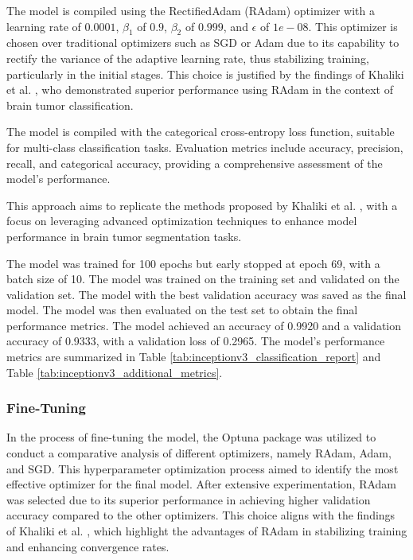 The model is compiled using the RectifiedAdam (RAdam) optimizer \cite{liu_variance_2019} with a learning rate of $0.0001$, $\beta_1$ of $0.9$, $\beta_2$ of $0.999$, and $\epsilon$ of $1e-08$. This optimizer is chosen over traditional optimizers such as SGD or Adam due to its capability to rectify the variance of the adaptive learning rate, thus stabilizing training, particularly in the initial stages. This choice is justified by the findings of Khaliki et al. \cite{khaliki_brain_2024}, who demonstrated superior performance using RAdam in the context of brain tumor classification.

The model is compiled with the categorical cross-entropy loss function, suitable for multi-class classification tasks. Evaluation metrics include accuracy, precision, recall, and categorical accuracy, providing a comprehensive assessment of the model's performance.

This approach aims to replicate the methods proposed by Khaliki et al. \cite{khaliki_brain_2024}, with a focus on leveraging advanced optimization techniques to enhance model performance in brain tumor segmentation tasks.

%
The model was trained for 100 epochs but early stopped at epoch 69, with a batch size of 10. The model was trained on the training set and validated on the validation set. The model with the best validation accuracy was saved as the final model. The model was then evaluated on the test set to obtain the final performance metrics. The model achieved an accuracy of 0.9920 and a validation accuracy of 0.9333, with a validation loss of 0.2965. The model's performance metrics are summarized in Table \ref{tab:inceptionv3_classification_report} and Table \ref{tab:inceptionv3_additional_metrics}.

\subsubsection{Fine-Tuning}

In the process of fine-tuning the model, the Optuna package was utilized to conduct a comparative analysis of different optimizers, namely RAdam, Adam, and SGD. This hyperparameter optimization process aimed to identify the most effective optimizer for the final model. After extensive experimentation, RAdam was selected due to its superior performance in achieving higher validation accuracy compared to the other optimizers. This choice aligns with the findings of Khaliki et al. \cite{khaliki_brain_2024}, which highlight the advantages of RAdam in stabilizing training and enhancing convergence rates.

